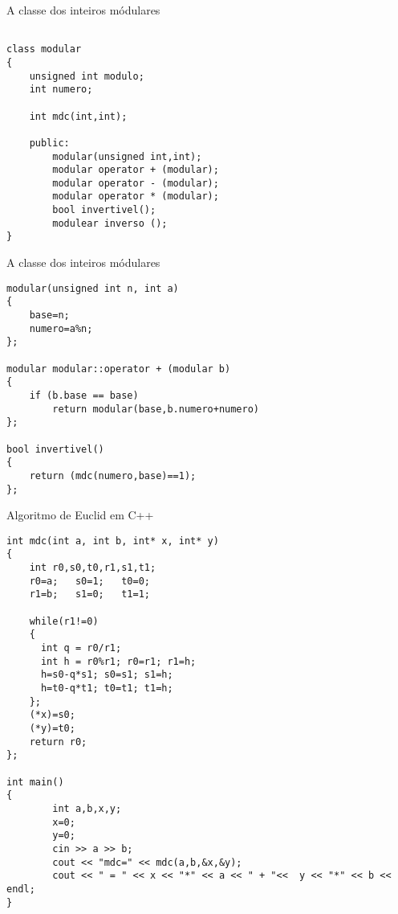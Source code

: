 \documentclass{beamer}
\begin{document}
\begin{frame}[fragile]{A classe dos inteiros módulares}
\lstset{language=C++}
\begin{lstlisting}

class modular
{
	unsigned int modulo;
	int numero;
	
	int mdc(int,int);
	
	public: 
		modular(unsigned int,int);
		modular operator + (modular);
		modular operator - (modular);
		modular operator * (modular);
		bool invertivel();
		modulear inverso ();
}
\end{lstlisting}
\end{frame}

\begin{frame}[fragile]{A classe dos inteiros módulares}
\lstset{language=C++,basicstyle=\tiny}
\begin{lstlisting}
modular(unsigned int n, int a)
{
	base=n;
	numero=a%n;
};

modular modular::operator + (modular b)
{
	if (b.base == base) 
		return modular(base,b.numero+numero)
};

bool invertivel()
{
	return (mdc(numero,base)==1);
};

\end{lstlisting}
\end{frame}

\begin{frame}[fragile]{Algoritmo de Euclid em C++}
\lstset{language=C++,basicstyle=\tiny}
\begin{lstlisting}
int mdc(int a, int b, int* x, int* y)
{
	int r0,s0,t0,r1,s1,t1;
	r0=a;	s0=1;	t0=0;
	r1=b;	s1=0;	t1=1;
	
	while(r1!=0)
	{
	  int q = r0/r1;	  
	  int h = r0%r1; r0=r1; r1=h;
	  h=s0-q*s1; s0=s1; s1=h;
	  h=t0-q*t1; t0=t1; t1=h;
	};
	(*x)=s0;
	(*y)=t0;
	return r0;
};

int main()
{
		int a,b,x,y;
		x=0;
		y=0;
		cin >> a >> b;
		cout << "mdc=" << mdc(a,b,&x,&y);
		cout << " = " << x << "*" << a << " + "<<  y << "*" << b << endl;
}
\end{lstlisting}
\end{frame}
\end{document}
